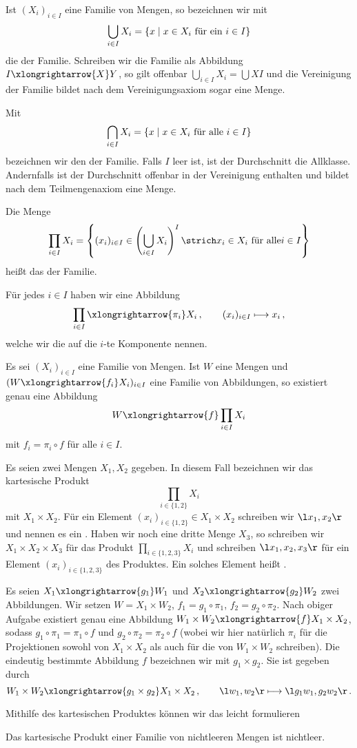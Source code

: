Ist $(X_i)_{i\in I}$ eine Familie von Mengen, so bezeichnen wir mit
\[
\bigcup_{i\in I}X_i=\left\{x\mid x\in X_i\textnormal{ für ein }i\in I\right\}
\]
die  der Familie. Schreiben wir die Familie als Abbildung $I\xlongrightarrow{X}Y$, so gilt offenbar $\bigcup_{i\in I}X_i=\bigcup XI$ und die Vereinigung der Familie bildet nach dem Vereinigungsaxiom sogar eine Menge.

Mit
\[
\bigcap_{i\in I}X_i=\left\{x\mid x\in X_i\textnormal{ für alle } i\in I\right\}
\]
bezeichnen wir den  der Familie. Falls $I$ leer ist, ist der Durchschnitt die Allklasse. Andernfalls ist der Durchschnitt offenbar in der Vereinigung enthalten und bildet nach dem Teilmengenaxiom eine Menge.

Die Menge
\[
\prod_{i\in I}X_i=\left\{(x_i)_{i\in I}\in\left(\bigcup_{i\in I}X_i\right)^I\strich x_i\in X_i\textnormal{ für alle} i\in I\right\}
\]
heißt das  der Familie.

Für jedes $i\in I$ haben wir eine Abbildung
\[
\prod_{i\in I}\xlongrightarrow{\pi_i}X_i\,,\qquad(x_i)_{i\in I}\longmapsto x_i\,,
\]
welche wir die  auf die $i$-te Komponente nennen.
\begin{auf}
Es sei $(X_i)_{i\in I}$ eine Familie von Mengen. Ist $W$ eine Mengen und $(W\xlongrightarrow{f_i}X_i)_{i\in I}$ eine Familie von Abbildungen, so existiert genau eine Abbildung
\[W\xlongrightarrow{f}\prod_{i\in I}X_i\]
mit $f_i=\pi_i\circ f$ für alle $i\in I$.
\end{auf}

Es seien zwei Mengen $X_1,X_2$ gegeben. In diesem Fall bezeichnen wir das kartesische Produkt
\[
\prod_{i\in \{1,2\}}X_i
\]
mit $X_1\times X_2$. Für ein Element $(x_i)_{i\in\{1,2\}}\in X_1\times X_2$ schreiben wir $\l x_1,x_2\r$ und nennen es ein . Haben wir noch eine dritte Menge $X_3$, so schreiben wir $X_1\times X_2\times X_3$ für das Produkt $\prod_{i\in\{1,2,3\}}X_i$ und schreiben $\l x_1,x_2,x_3\r$ für ein Element $(x_i)_{i\in\{1,2,3\}}$ des Produktes. Ein solches Element heißt .

\begin{bsp}
Es seien $X_1\xlongrightarrow{g_1}W_1$ und $X_2\xlongrightarrow{g_2}W_2$ zwei Abbildungen. Wir setzen $W=X_1\times W_2$, $f_1=g_1\circ\pi_1$, $f_2=g_2\circ\pi_2$. Nach obiger Aufgabe existiert genau eine Abbildung $W_1\times W_2\xlongrightarrow{f}X_1\times X_2$, sodass $g_1\circ\pi_1=\pi_1\circ f$ und $g_2\circ\pi_2=\pi_2\circ f$ (wobei wir hier natürlich $\pi_i$ für die Projektionen sowohl von $X_1\times X_2$ als auch für die von $W_1\times W_2$ schreiben). Die eindeutig bestimmte Abbildung $f$ bezeichnen wir mit $g_1\times g_2$. Sie ist gegeben durch
\[
W_1\times W_2\xlongrightarrow{g_1\times g_2}X_1\times X_2\,,\qquad \l w_1,w_2\r\longmapsto\l g_1w_1,g_2w_2\r\,.
\]
\end{bsp}
Mithilfe des kartesischen Produktes können wir das  leicht formulieren
\begin{axiom}
Das kartesische Produkt einer Familie von nichtleeren Mengen ist nichtleer.
\end{axiom}

